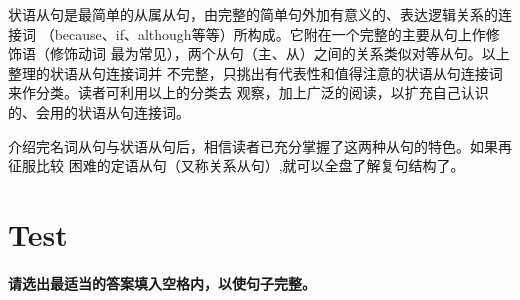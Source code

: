 状语从句是最简单的从属从句，由完整的简单句外加有意义的、表达逻辑关系的连接词
（because、if、although等等）所构成。它附在一个完整的主要从句上作修饰语（修饰动词
最为常见），两个从句（主、从）之间的关系类似对等从句。以上整理的状语从句连接词并
不完整，只挑出有代表性和值得注意的状语从句连接词来作分类。读者可利用以上的分类去
观察，加上广泛的阅读，以扩充自己认识的、会用的状语从句连接词。

介绍完名词从句与状语从句后，相信读者已充分掌握了这两种从句的特色。如果再征服比较
困难的定语从句（又称关系从句）,就可以全盘了解复句结构了。

\section{Test}

\paragraph{请选出最适当的答案填入空格内，以使句子完整。}

